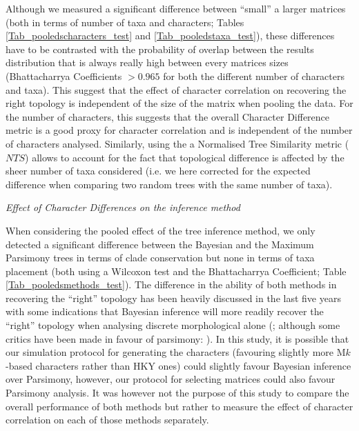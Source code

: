 \documentclass[12pt,letterpaper]{article}
\renewcommand{\subsection}[1]{%
\bigskip
\begin{center}
\begin{large}
\normalfont\itshape #1
\end{large}
\end{center}}
\begin{document}
Although we measured a significant difference between ``small'' a larger matrices (both in terms of number of taxa and characters; Tables \ref{Tab_pooledscharacters_test} and \ref{Tab_pooledstaxa_test}), these differences have to be contrasted with the probability of overlap between the results distribution that is always really high between every matrices sizes (Bhattacharrya Coefficients $>0.965$ for both the different number of characters and taxa).
This suggest that the effect of character correlation on recovering the right topology is independent of the size of the matrix when pooling the data.
For the number of characters, this suggests that the overall Character Difference metric is a good proxy for character correlation and is independent of the number of characters analysed.
Similarly, using the a Normalised Tree Similarity metric ($NTS$) allows to account for the fact that topological difference is affected by the sheer number of taxa considered (i.e. we here corrected for the expected difference when comparing two random trees with the same number of taxa).

\subsection{Effect of Character Differences on the inference method}
When considering the pooled effect of the tree inference method, we only detected a significant difference between the Bayesian and the Maximum Parsimony trees in terms of clade conservation but none in terms of taxa placement (both using a Wilcoxon test and the Bhattacharrya Coefficient; Table \ref{Tab_pooledsmethods_test}).
The difference in the ability of both methods in recovering the ``right'' topology has been heavily discussed in the last five years with some indications that Bayesian inference will more readily recover the ``right'' topology when analysing discrete morphological alone (\citealt{wrightbayesian2014,OReilly20160081,puttick2017uncertain}; although some critics have been made in favour of parsimony: \citealt{spencerefficacy2013,goloboff2017weighted}).
In this study, it is possible that our simulation protocol for generating the characters (favouring slightly more M$k$-based characters rather than HKY ones) could slightly favour Bayesian inference over Parsimony, however, our protocol for selecting matrices \citep[i.e. those with in a $CI>0.26$ in a quick parsimony search;]{OReilly20160081} could also favour Parsimony analysis.
It was however not the purpose of this study to compare the overall performance of both methods but rather to measure the effect of character correlation on each of those methods separately.
\end{document}
